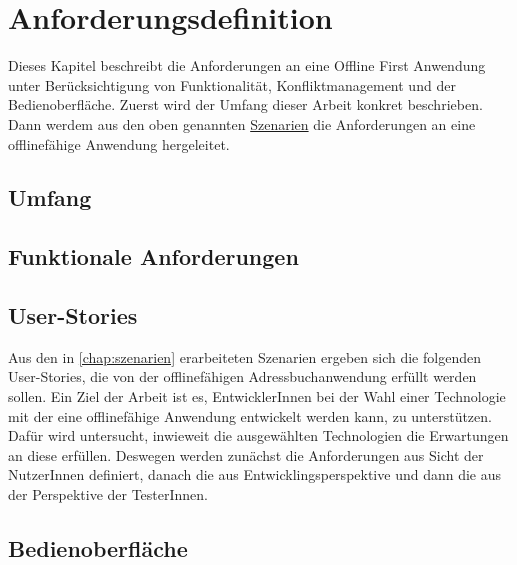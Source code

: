 \chapter{\label{chap:anforderungen}Anforderungsdefinition}
Dieses Kapitel beschreibt die Anforderungen an eine Offline First Anwendung unter Berücksichtigung von Funktionalität, Konfliktmanagement und der Bedienoberfläche.
Zuerst wird der Umfang dieser Arbeit konkret beschrieben. Dann werdem aus den oben genannten \hyperref[chap:szenarien]{Szenarien} die Anforderungen an eine offlinefähige Anwendung hergeleitet.
%
%
\section{Umfang}

%
%
\section{\label{chap:funktionaleanforderungen}Funktionale Anforderungen}

%
%
\section{User-Stories}
Aus den in \autoref{chap:szenarien} erarbeiteten Szenarien ergeben sich die folgenden User-Stories, die von der offlinefähigen Adressbuchanwendung erfüllt werden sollen.
Ein Ziel der Arbeit ist es, EntwicklerInnen bei der Wahl einer Technologie mit der eine offlinefähige Anwendung entwickelt werden kann, zu unterstützen. Dafür wird untersucht, inwieweit die ausgewählten Technologien die Erwartungen an diese erfüllen.
Deswegen werden zunächst die Anforderungen aus Sicht der NutzerInnen definiert, danach die aus Entwicklingsperspektive und dann die aus der Perspektive der TesterInnen.



%
%
\section{Bedienoberfläche}
